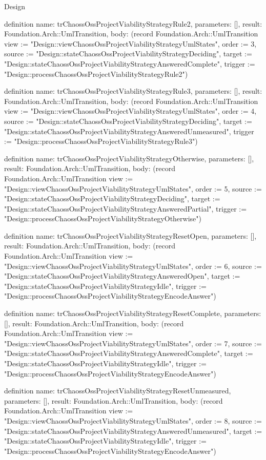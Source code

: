 \begin{lexlean}{Design}
\begin{semanticmodule}
definition{
  name: trChaossOssProjectViabilityStrategyRule2,
  parameters: [],
  result: Foundation.Arch::UmlTransition,
  body: (record Foundation.Arch::UmlTransition {view := "Design::viewChaossOssProjectViabilityStrategyUmlStates", order := 3, source := "Design::stateChaossOssProjectViabilityStrategyDeciding", target := "Design::stateChaossOssProjectViabilityStrategyAnsweredComplete", trigger := "Design::processChaossOssProjectViabilityStrategyRule2"})
}

definition{
  name: trChaossOssProjectViabilityStrategyRule3,
  parameters: [],
  result: Foundation.Arch::UmlTransition,
  body: (record Foundation.Arch::UmlTransition {view := "Design::viewChaossOssProjectViabilityStrategyUmlStates", order := 4, source := "Design::stateChaossOssProjectViabilityStrategyDeciding", target := "Design::stateChaossOssProjectViabilityStrategyAnsweredUnmeasured", trigger := "Design::processChaossOssProjectViabilityStrategyRule3"})
}

definition{
  name: trChaossOssProjectViabilityStrategyOtherwise,
  parameters: [],
  result: Foundation.Arch::UmlTransition,
  body: (record Foundation.Arch::UmlTransition {view := "Design::viewChaossOssProjectViabilityStrategyUmlStates", order := 5, source := "Design::stateChaossOssProjectViabilityStrategyDeciding", target := "Design::stateChaossOssProjectViabilityStrategyAnsweredPartial", trigger := "Design::processChaossOssProjectViabilityStrategyOtherwise"})
}

definition{
  name: trChaossOssProjectViabilityStrategyResetOpen,
  parameters: [],
  result: Foundation.Arch::UmlTransition,
  body: (record Foundation.Arch::UmlTransition {view := "Design::viewChaossOssProjectViabilityStrategyUmlStates", order := 6, source := "Design::stateChaossOssProjectViabilityStrategyAnsweredOpen", target := "Design::stateChaossOssProjectViabilityStrategyIdle", trigger := "Design::processChaossOssProjectViabilityStrategyEncodeAnswer"})
}

definition{
  name: trChaossOssProjectViabilityStrategyResetComplete,
  parameters: [],
  result: Foundation.Arch::UmlTransition,
  body: (record Foundation.Arch::UmlTransition {view := "Design::viewChaossOssProjectViabilityStrategyUmlStates", order := 7, source := "Design::stateChaossOssProjectViabilityStrategyAnsweredComplete", target := "Design::stateChaossOssProjectViabilityStrategyIdle", trigger := "Design::processChaossOssProjectViabilityStrategyEncodeAnswer"})
}

definition{
  name: trChaossOssProjectViabilityStrategyResetUnmeasured,
  parameters: [],
  result: Foundation.Arch::UmlTransition,
  body: (record Foundation.Arch::UmlTransition {view := "Design::viewChaossOssProjectViabilityStrategyUmlStates", order := 8, source := "Design::stateChaossOssProjectViabilityStrategyAnsweredUnmeasured", target := "Design::stateChaossOssProjectViabilityStrategyIdle", trigger := "Design::processChaossOssProjectViabilityStrategyEncodeAnswer"})
}


\end{semanticmodule}
\end{lexlean}
